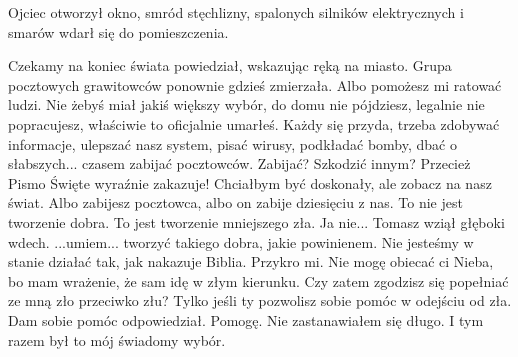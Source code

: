 Ojciec otworzył okno, smród stęchlizny, spalonych silników elektrycznych i smarów wdarł się do pomieszczenia.

\begin{dialogue}
\ds{} Czekamy na koniec świata \dm{} powiedział, wskazując ręką na miasto. Grupa pocztowych grawitowców ponownie gdzieś zmierzała. \dm{}
Albo pomożesz mi ratować ludzi. Nie żebyś miał jakiś większy wybór, do domu nie pójdziesz, legalnie nie popracujesz, właściwie to oficjalnie umarłeś. 
Każdy się przyda, trzeba zdobywać informacje, ulepszać nasz system, pisać wirusy, podkładać bomby, dbać o słabszych... czasem zabijać pocztowców. 
\ds{} Zabijać? Szkodzić innym? Przecież Pismo Święte wyraźnie zakazuje!
\ds{} Chciałbym być doskonały, ale zobacz na nasz świat.
Albo zabijesz pocztowca, albo on zabije dziesięciu z nas. 
To nie jest tworzenie dobra. To jest tworzenie mniejszego zła.
Ja nie... \dm{} Tomasz wziął głęboki wdech. \dm{} ...umiem... tworzyć takiego dobra, jakie powinienem.
Nie jesteśmy w stanie działać tak, jak nakazuje Biblia. Przykro mi.
Nie mogę obiecać ci Nieba, bo mam wrażenie, że sam idę w złym kierunku. Czy zatem zgodzisz się popełniać ze mną zło przeciwko złu? 
\ds{} Tylko jeśli ty pozwolisz sobie pomóc w odejściu od zła.
\ds{} Dam sobie pomóc \dm{} odpowiedział.
\ds{} Pomogę. \dm{} Nie zastanawiałem się długo. \dm{} I tym razem był to mój świadomy wybór.
\end{dialogue}



